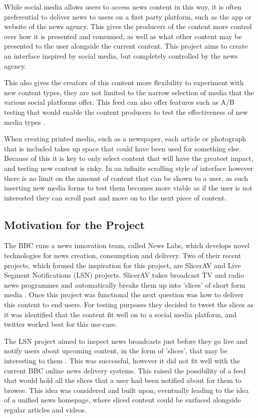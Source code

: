 \documentclass[12pt,titlepage]{article}
\begin{document}
  While social media allows users to access news content in this way, it is
  often preferential to deliver news to users on a first party platform, such as
  the app or website of the news agency. This gives the producers of the content
  more control over how it is presented and consumed, as well as what other
  content may be presented to the user alongside the current content. This
  project aims to create an interface inspired by social media, but completely
  controlled by the news agency.

  This also gives the creators of this content more flexibility to experiment
  with new content types, they are not limited to the narrow selection of media
  that the various social platforms offer. This feed can also offer features
  such as A/B testing that would enable the content producers to test the
  effectiveness of new media types \citep{ab}.

  When creating printed media, such as a newspaper, each article or photograph
  that is included takes up space that could have been used for something else.
  Because of this it is key to only select content that will have the greatest
  impact, and testing new content is risky. In an infinite scrolling style of
  interface however there is no limit on the amount of content that can be shown
  to a user, as such inserting new media forms to test them becomes more viable
  as if the user is not interested they can scroll past and move on to the next
  piece of content.

  \subsection{Motivation for the Project}

  The BBC runs a news innovation team, called News Labs, which develops novel
  technologies for news creation, consumption and delivery. Two of their recent
  projects, which formed the inspiration for this project, are SlicerAV and Live
  Segment Notifications (LSN) projects. SlicerAV takes broadcast TV and radio
  news programmes and automatically breaks them up into 'slices' of short form
  media \citep{slicer}. Once this project was functional the next question was
  how to deliver this content to end users. For testing purposes they decided to
  tweet the slices as it was identified that the content fit well on to a social
  media platform, and twitter worked best for this use-case.

  The LSN project aimed to inspect news broadcasts just before they go live and
  notify users about upcoming content, in the form of 'slices', that may be
  interesting to them \citep{lsn}. This was successful, however it did not fit
  well with the current BBC online news delivery systems. This raised the
  possibility of a feed that would hold all the slices that a user had been
  notified about for them to browse. This idea was considered and built upon,
  eventually leading to the idea of a unified news homepage, where sliced
  content could be surfaced alongside regular articles and videos.
\end{document}
